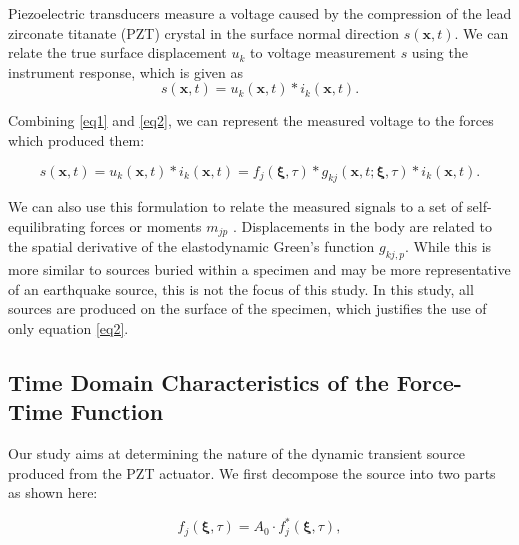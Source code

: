 \documentclass[preprint,3p, 11pt,authoryear]{elsarticle}
\begin{document}
Piezoelectric transducers measure a voltage caused by the compression of the lead zirconate titanate (PZT) crystal in the surface normal direction $s\left( \mathbf{x}, t \right)$. We can relate the true surface displacement $u_{k}$ to voltage measurement $s$ using the instrument response, which is given as
   \begin{equation}
    \label{eq2}
        s\left( \mathbf{x}, t \right) =
            u_{k}\left( \mathbf{x}, t \right) \ast i_{k}\left(\mathbf{x},t \right).
    \end{equation}
    
    \noindent Combining \eqref{eq1} and \eqref{eq2}, we can represent the measured voltage to the forces which produced them:

    \begin{equation}
    \label{eq3}
        s\left( \mathbf{x}, t \right) =
            u_{k}\left( \mathbf{x}, t \right) \ast i_{k}\left(\mathbf{x}, t \right) =  
                f_{j}\left( \mathbf{\xi}, \tau \right) \ast 
                g_{kj}\left( \mathbf{x}, t;\mathbf{\xi}, \tau \right) \ast i_{k}\left(\mathbf{x},  t \right).
    \end{equation}

\noindent We can also use this formulation to relate the measured signals to a set of self-equilibrating forces or moments $m_{jp}$ \citep{Aki2002}. Displacements in the body are related to the spatial derivative of the elastodynamic Green's function $g_{kj,p}$.  While this is more similar to sources buried within a specimen and may be more representative of an earthquake source, this is not the focus of this study.  In this study, all sources are produced on the surface of the specimen, which justifies the use of only equation \eqref{eq2}.

\subsection{Time Domain Characteristics of the Force-Time Function}
\label{force_time}

Our study aims at determining the nature of the dynamic transient source produced from the PZT actuator. We first decompose the source into two parts as shown here:

\begin{equation}
    \label{eq4}
    f_{j}\left( \mathbf{\xi}, \tau \right) =A_{0} \cdot f^{*}_{j}\left( \mathbf{\xi}, \tau \right) ,
\end{equation}
\end{document}
